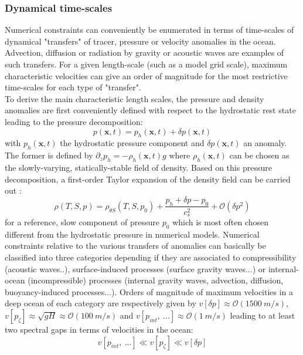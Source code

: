 \subsubsection{Dynamical time-scales}
Numerical constraints can conveniently be enumerated in terms of time-scales of dynamical "transfers" of tracer, pressure or velocity anomalies in the ocean. Advection, diffusion or radiation by gravity or acoustic waves are examples of such transfers. For a given length-scale (such as a model grid scale), maximum characteristic velocities can give  an order of magnitude for the most restrictive time-scales for each type of "transfer".\\
To derive the main characteristic length scales, the pressure and density anomalies are first conveniently defined with respect to the hydrostatic rest state leading to the pressure decomposition:
\begin{equation}
	\displaystyle
	\label{decompoP_0}
	p(\mathbf{x},t)=p_h(\mathbf{x},t)+\delta p(\mathbf{x},t)
\end{equation}
with $p_h(\mathbf{x},t)$ the hydrostatic pressure component and $\delta p(\mathbf{x},t)$ an anomaly. The former is defined by $\partial_z p_h=-\rho_h(\mathbf{x},t) g$ where $\rho_h(\mathbf{x},t)$ can be chosen as the slowly-varying, statically-stable field of density. Based on this pressure decomposition, a first-order Taylor expansion of the density field can be carried out :
\begin{equation}
  \displaystyle 
	\label{decompor_0}
  \rho(T,S,p)=\rho_{\theta S}(T,S,p_0)+\frac{p_h+\delta p-p_0}{c_s^2}+\mathcal{O}(\delta p^2)
\end{equation}
for a reference, slow component of pressure $p_0$ which is most often chosen different from the hydrostatic pressure in numerical models.
Numerical constraints relative to the various transfers of anomalies can basically be classified into three categories depending if they are associated to compressibility (acoustic waves..), surface-induced processes (surface gravity waves...) or internal-ocean (incompressible) processes (internal gravity waves, advection, diffusion, buoyancy-induced processes...). Orders of magnitude of maximum velocities in a deep ocean of each category are respectively given by $v[\delta p]\approx \mathcal{O}(1500\ m/s)$, $v[p_\zeta]\approx\sqrt{g H}\approx \mathcal{O}(100\ m/s)$ and $v[p_{int},\ ...]\approx \mathcal{O}(1\ m/s)$ leading to at least two spectral gaps in terms of velocities in the ocean:
\begin{equation}
	\displaystyle
	\label{velocityscales}
	v[p_{int},\ ...] \ll v[p_\zeta] \ll v[\delta p]
\end{equation} 
